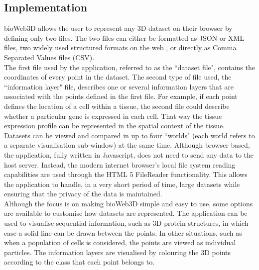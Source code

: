 	\subsection{Implementation}

bioWeb3D allows the user to represent any 3D dataset on their browser by defining only two files. The two files can either be formatted as JSON or XML files, two widely used structured formats on the web \cite{Wilde07} \cite{xmlref}, or directly as Comma Separated Values files (CSV).\\
The first file used by the application, referred to as the ``dataset file", contains the coordinates of every point in the dataset. The second type of file used, the ``information layer" file, describes one or several information layers that are associated with the points defined in the first file. For example, if each point defines the location of a cell within a tissue, the second file could describe whether a particular gene is expressed in each cell. That way the tissue expression profile can be represented in the spatial context of the tissue.\\
Datasets can be viewed and compared in up to four ``worlds" (each world refers to a separate visualisation sub-window) at the same time. Although browser based, the application, fully written in Javascript, does not need to send any data to the host server. Instead, the modern internet browser's local file system reading capabilities are used through the HTML 5 FileReader functionality. This allows the application to handle, in a very short period of time, large datasets while ensuring that the privacy of the data is maintained.\\
Although the focus is on making bioWeb3D simple and easy to use, some options are available to customise how datasets are represented. The application can be used to visualise sequential information, such as 3D protein structures, in which case a solid line can be drawn between the points. In other situations, such as when a population of cells is considered, the points are viewed as individual particles. The information layers are visualised by colouring the 3D points according to the class that each point belongs to.
